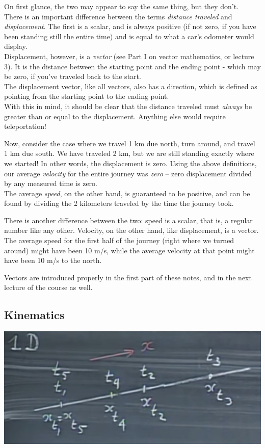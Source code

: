 \documentclass[8.01x]{subfiles}
\begin{document}
On first glance, the two may appear to say the same thing, but they don't.\\
There is an important difference between the terms \emph{distance traveled} and \emph{displacement}. The first is a scalar, and is always positive (if not zero, if you have been standing still the entire time) and is equal to what a car's odometer would display.\\
Displacement, however, is a \emph{vector} (see Part I on vector mathematics, or lecture 3). It is the distance between the starting point and the ending point - which may be zero, if you've traveled back to the start.\\
The displacement vector, like all vectors, also has a direction, which is defined as pointing from the starting point to the ending point.\\
With this in mind, it should be clear that the distance traveled must \emph{always} be greater than or equal to the displacement. Anything else would require teleportation!

Now, consider the case where we travel 1 km due north, turn around, and travel 1 km due south. We have traveled 2 km, but we are still standing exactly where we started! In other words, the displacement is zero. Using the above definitions, our average \emph{velocity} for the entire journey was \emph{zero} -- zero displacement divided by any measured time is zero.\\
The average \emph{speed}, on the other hand, is guaranteed to be positive, and can be found by dividing the 2 kilometers traveled by the time the journey took.

There is another difference between the two: speed is a scalar, that is, a regular number like any other. Velocity, on the other hand, like displacement, is a vector.\\
The average speed for the first half of the journey (right where we turned around) might have been 10 m/s, while the average velocity at that point might have been 10 m/s to the north.

Vectors are introduced properly in the first part of these notes, and in the next lecture of the course as well.

\subsection{Kinematics}

\begin{center}
\includegraphics[scale=0.75]{Graphics/1d-motion}
\end{center}
\end{document}
